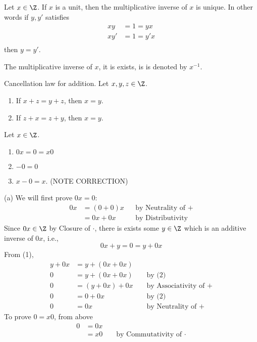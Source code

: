 \begin{prop}
  Let $x \in \Z$.
  If $x$ is a unit, then the multiplicative inverse of $x$ is unique.
  In other words if $y,y'$ satisfies
  \begin{align*}
    x  y &= 1 = y x \\
    x  y' &= 1 = y' x \\
  \end{align*}
  then $y = y'$.
\end{prop}

\begin{defn}
  The multiplicative inverse of $x$, it is exists, is is denoted by $x^{-1}$.
\end{defn}

\begin{prop}
  Cancellation law for addition.
  Let $x, y, z \in \Z$.
  \begin{enumerate}[nosep,label=\textnormal{(\alph*)}]
    \item If $x + z = y + z$, then $x = y$.
    \item If $z + x = z + y$, then $x = y$.
  \end{enumerate}
\end{prop}

\begin{prop}
  Let $x \in \Z$.
  \begin{enumerate}[nosep,label=\textnormal{(\alph*)}]
  \item $0x = 0 = x0$
  \item $-0 = 0$
  \item $x - 0 = x$. \textred(NOTE CORRECTION)
  \end{enumerate}
\end{prop}
\proof
(a) We will first prove $0x = 0$:
\begin{align*}
  0x &= (0 + 0)x & & \text{by Neutrality of $+$} \\
     &= 0x + 0x  & & \text{by Distributivity} \tag{1}
\end{align*}
Since $0x \in \Z$ by Closure of $\cdot$, there is
exists some $y \in \Z$ which is an additive inverse of $0x$, i.e.,
\[
0x + y = 0 = y + 0x \tag{2}
\]
From (1),
\begin{align*}
  y + 0x &= y + (0x + 0x)  \\
  0      &= y + (0x + 0x) & & \text{ by (2)} \\
  0      &= (y + 0x) + 0x & & \text{ by Associativity of $+$} \\
  0      &= 0 + 0x        & & \text{ by (2)} \\
  0      &= 0x            & & \text{ by Neutrality of $+$}
\end{align*}
To prove $0 = x0$, from above
\begin{align*}
  0 &= 0x \\
    &= x0 & & \text{ by Commutativity of $\cdot$}
\end{align*}

